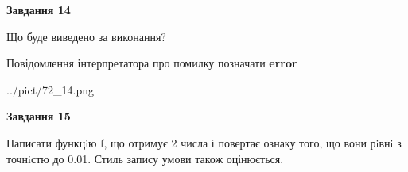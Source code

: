 \documentclass[11pt, ukrainian]{article}
\begin{document}
{\begin {large}
{\begin {center}\textbf{Завдання 14}\end {center}}\par
Що буде виведено за виконання? \par
Повідомлення інтерпретатора про помилку позначати \textbf{error}

\begin{center}
	{../pict/72_14.png}
\end{center}
\newpage

{\begin {center}\textbf{Завдання 15}\end {center}}\par

Написати функцiю f, що отримує 2 числа і повертає ознаку того, що вони рiвнi з точнiстю до 0.01. Стиль запису умови також оцінюється.\par
\newpage

\end {large}}
\end{document}
